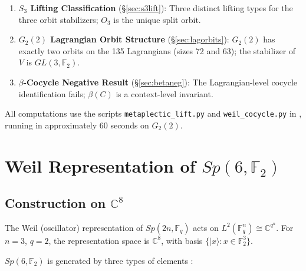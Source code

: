 \documentclass[11pt,a4paper]{article}
\theoremstyle{remark}
\begin{document}
\begin{enumerate}
  \item \textbf{$S_3$ Lifting Classification} (\S\ref{sec:s3lift}):
        Three distinct lifting types for the three orbit stabilizers;
        $O_3$ is the unique split orbit.

  \item \textbf{$G_2(2)$ Lagrangian Orbit Structure} (\S\ref{sec:lagorbits}):
        $G_2(2)$ has exactly two orbits on the 135 Lagrangians (sizes 72 and 63);
        the stabilizer of $V$ is $GL(3,\mathbb{F}_2)$.

  \item \textbf{$\beta$-Cocycle Negative Result} (\S\ref{sec:betaneg}):
        The Lagrangian-level cocycle identification fails;
        $\beta(C)$ is a context-level invariant.
\end{enumerate}

\noindent
All computations use the scripts \texttt{metaplectic\_lift.py} and
\texttt{weil\_cocycle.py} in \cite{PaperXVsuppl}, running in approximately
60 seconds on $G_2(2)$.


\section{\texorpdfstring{Weil Representation of $Sp(6,\mathbb{F}_2)$}{Weil Representation of Sp(6,F2)}}\label{sec:weil}

\subsection{\texorpdfstring{Construction on $\mathbb{C}^8$}{Construction on C8}}

The Weil (oscillator) representation of $Sp(2n,\mathbb{F}_q)$ acts on
$L^2(\mathbb{F}_q^n) \cong \mathbb{C}^{q^n}$.
For $n=3$, $q=2$, the representation space is $\mathbb{C}^8$, with
basis $\{|x\rangle : x \in \mathbb{F}_2^3\}$.

$Sp(6,\mathbb{F}_2)$ is generated by three types of elements
\cite{Gerardin, GurevichHadani}:
\end{document}
